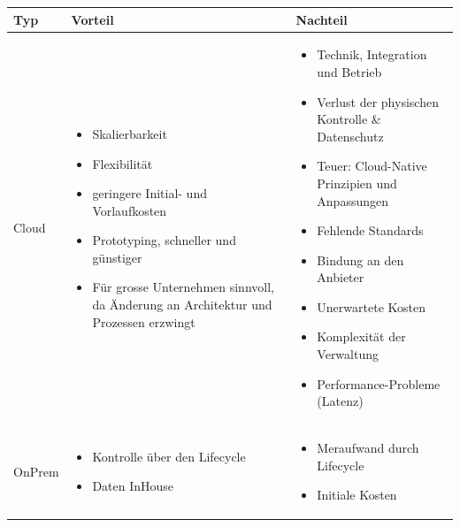 \documentclass[../Main.tex]{subfiles}
\begin{document}
\begin{table}[H]
\begin{tabularx}{\columnwidth}{X|X|X}
    \hline
    Typ & Vorteil & Nachteil \\
    \hline
    Cloud & 
    \begin{minipage}[t]{\linewidth}
        \begin{itemize}
            \item Skalierbarkeit
            \item Flexibilität
            \item geringere Initial- und Vorlaufkosten
            \item Prototyping, schneller und günstiger
            \item Für grosse Unternehmen sinnvoll, da Änderung an Architektur und Prozessen erzwingt
        \end{itemize}
    \end{minipage} & 
    \begin{minipage}[t]{\linewidth}
        \begin{itemize}
            \item Technik, Integration und Betrieb
            \item Verlust der physischen Kontrolle \& Datenschutz
            \item Teuer: Cloud-Native Prinzipien und Anpassungen
            \item Fehlende Standards
            \item Bindung an den Anbieter
            \item Unerwartete Kosten
            \item Komplexität der Verwaltung
            \item Performance-Probleme (Latenz)
        \end{itemize}
    \end{minipage} \\
    \hline
    OnPrem & \begin{itemize}
        \item Kontrolle über den Lifecycle
        \item Daten InHouse
    \end{itemize} & \begin{itemize}
        \item Meraufwand durch Lifecycle
        \item Initiale Kosten
    \end{itemize}
\end{tabularx}
\end{table}
\end{document}
